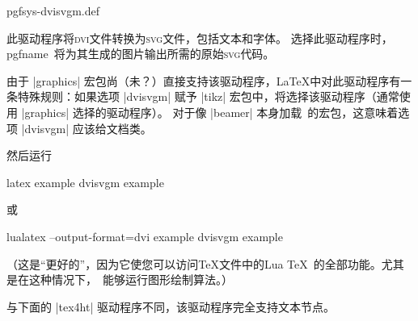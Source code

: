 \begin{filedescription}{pgfsys-dvisvgm.def}

    此驱动程序将\textsc{dvi}文件转换为\textsc{svg}文件，包括文本和字体。 选择此驱动程序时， pgfname\ 将为其生成的图片输出所需的原始\textsc{svg}代码。


    由于 |graphics| 宏包尚（未？）直接支持该驱动程序，\LaTeX 中对此驱动程序有一条特殊规则：如果选项 |dvisvgm| 赋予 |tikz| 宏包中，将选择该驱动程序（通常使用 |graphics| 选择的驱动程序）。 对于像 |beamer| 本身加载\pgfname\ 的宏包，这意味着选项 |dvisvgm| 应该给文档类。

    然后运行
\begin{codeexample}
latex example
dvisvgm example
\end{codeexample}
    或
\begin{codeexample}
lualatex --output-format=dvi example
dvisvgm example
\end{codeexample}

    （这是``更好的''，因为它使您可以访问\TeX 文件中的Lua \TeX\ 的全部功能。尤其是在这种情况下，\tikzname\ 能够运行图形绘制算法。）


    与下面的 |tex4ht| 驱动程序不同，该驱动程序完全支持文本节点。
\end{filedescription}

